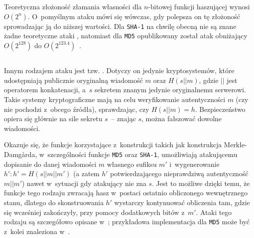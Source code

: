 Teoretyczna złożoność złamania własności  dla
$n$-bitowej funkcji haszującej wynosi $O(2^n)$. O~pomyślnym ataku mówi się
wówczas, gdy polepsza on tę złożoność sprowadzając ją do niższej wartości. Dla
\texttt{SHA-1} na chwilę obecną nie są znane żadne teoretyczne ataki
, natomiast dla \texttt{MD5} opublikowany został atak obniżający
$O(2^{128})$ do $O(2^{123.4})$~\cite{best_md5_preimage_attack}.



\label{length_extension_attack}
\subsection{}
Innym rodzajem ataku jest tzw. . Dotyczy on jedynie
kryptosystemów, które udostępniają publicznie oryginalną wiadomość $m$ oraz
$H(s || m)$, gdzie $||$ jest operatorem konkatenacji, a~$s$ sekretem znanym
jedynie oryginalnemu serwerowi. Takie systemy kryptograficzne mają na celu
weryfikowanie autentyczności $m$ (czy nie pochodzi z~obcego źródła),
sprawdzając, czy $H(s||m)=h$. Bezpieczeństwo opiera się głównie na sile sekretu
$s$~-- znając $s$, można fałszować dowolne wiadomości.

Okazuje się, że funkcje korzystające z~konstrukcji takich jak konstrukcja
Merkle-Damg\r{a}rda, w~szczególności funkcje \texttt{MD5} oraz \texttt{SHA-1},
umożliwiają atakującemu dopisanie do danej wiadomości $m$ własnego sufiksu $m'$
i~wygenerowanie $h' : h' = H(s || m || m')$ (a zatem $h'$ potwierdzającego
nieprawdziwą autentyczność $m||m'$) nawet w~sytuacji gdy atakujący nie zna $s$.
Jest to możliwe dzięki temu, że funkcje tego rodzaju zwracają hasz w~postaci
ostatnio obliczonego wewnętrznego stanu, dlatego do skonstruowania $h'$
wystarczy kontynuować obliczenia tam, gdzie się wcześniej zakończyły, przy
pomocy dodatkowych bitów z~$m'$. Ataki tego rodzaju są szczegółowo opisane
w~\cite{md5_length_extension_attack}; przykładowa implementacja dla
\texttt{MD5} może być z~kolei znaleziona
w~\cite{md5_length_extension_attack_implementation}.
